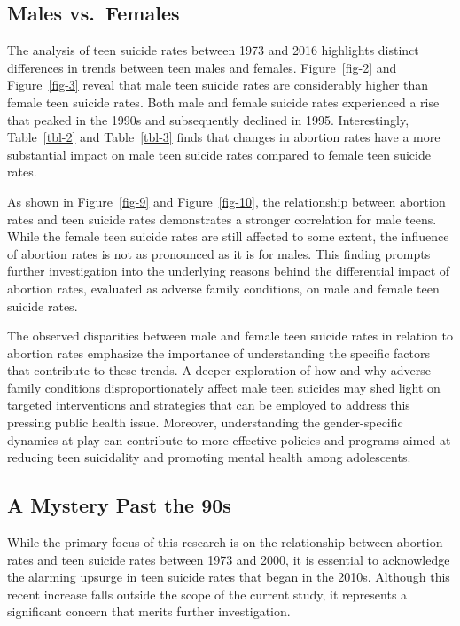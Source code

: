 \documentclass[
  letterpaper,
  DIV=11,
  numbers=noendperiod]{scrartcl}
\begin{document}
\hypertarget{males-vs.-females}{%
\subsection{Males vs.~Females}\label{males-vs.-females}}

The analysis of teen suicide rates between 1973 and 2016 highlights
distinct differences in trends between teen males and females.
Figure~\ref{fig-2} and Figure~\ref{fig-3} reveal that male teen suicide
rates are considerably higher than female teen suicide rates. Both male
and female suicide rates experienced a rise that peaked in the 1990s and
subsequently declined in 1995. Interestingly, Table~\ref{tbl-2} and
Table~\ref{tbl-3} finds that changes in abortion rates have a more
substantial impact on male teen suicide rates compared to female teen
suicide rates.

As shown in Figure~\ref{fig-9} and Figure~\ref{fig-10}, the relationship
between abortion rates and teen suicide rates demonstrates a stronger
correlation for male teens. While the female teen suicide rates are
still affected to some extent, the influence of abortion rates is not as
pronounced as it is for males. This finding prompts further
investigation into the underlying reasons behind the differential impact
of abortion rates, evaluated as adverse family conditions, on male and
female teen suicide rates.

The observed disparities between male and female teen suicide rates in
relation to abortion rates emphasize the importance of understanding the
specific factors that contribute to these trends. A deeper exploration
of how and why adverse family conditions disproportionately affect male
teen suicides may shed light on targeted interventions and strategies
that can be employed to address this pressing public health issue.
Moreover, understanding the gender-specific dynamics at play can
contribute to more effective policies and programs aimed at reducing
teen suicidality and promoting mental health among adolescents.

\hypertarget{a-mystery-past-the-90s}{%
\subsection{A Mystery Past the 90s}\label{a-mystery-past-the-90s}}

While the primary focus of this research is on the relationship between
abortion rates and teen suicide rates between 1973 and 2000, it is
essential to acknowledge the alarming upsurge in teen suicide rates that
began in the 2010s. Although this recent increase falls outside the
scope of the current study, it represents a significant concern that
merits further investigation.
\end{document}
